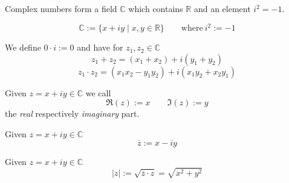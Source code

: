 Complex numbers form a field \(\mathbb{C}\) which contains \(\mathbb{R}\) and an element \(i^2 = -1\).

\begin{definition}
   \[\mathbb{C} := \{x + iy \mid x, y \in \mathbb{R}\} \qquad\text{where}~i^2 := -1\]
\end{definition}
\begin{remark}
   We define \(0 \cdot i := 0\) and have for \(z_1, z_2 \in \mathbb{C}\)
   \[z_1 + z_2 =  (x_1 + x_2) + i(y_1 + y_2)\]
   \[z_1 \cdot z_2 = (x_1x_2 - y_1y_2) + i(x_1y_2 + x_2y_1)\]
\end{remark}

\begin{definition}
   Given \(z = x + iy \in \mathbb{C}\) we call
   \[\Re(z) := x \qquad \Im(z) := y\]
   the \emph{real} respectively \emph{imaginary} part.
\end{definition}

\begin{definition}
   Given \(z = x + iy \in \mathbb{C}\)
   \[\overline{z} := x - iy\]
\end{definition}

\begin{definition}
   Given \(z = x + iy \in \mathbb{C}\)
   \[|z| := \sqrt{\overline{z} \cdot z} = \sqrt{x^2 + y^2}\]
\end{definition}

